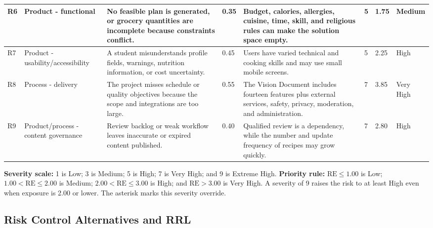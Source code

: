 \documentclass[11pt,a4paper]{article}
\begin{document}
\begin{landscape}
\begin{center}
\begin{longtable}{|p{0.8cm}|p{3.2cm}|p{5.1cm}|p{1.4cm}|p{8.0cm}|p{1.6cm}|p{1.3cm}|p{1.8cm}|}
R6 & Product - functional & No feasible plan is generated, or grocery quantities are incomplete because constraints conflict. & 0.35 & Budget, calories, allergies, cuisine, time, skill, and religious rules can make the solution space empty. & 5 & 1.75 & Medium \\ \hline
R7 & Product - usability/accessibility & A student misunderstands profile fields, warnings, nutrition information, or cost uncertainty. & 0.45 & Users have varied technical and cooking skills and may use small mobile screens. & 5 & 2.25 & High \\ \hline
R8 & Process - delivery & The project misses schedule or quality objectives because the scope and integrations are too large. & 0.55 & The Vision Document includes fourteen features plus external services, safety, privacy, moderation, and administration. & 7 & 3.85 & Very High \\ \hline
R9 & Product/process - content governance & Review backlog or weak workflow leaves inaccurate or expired content published. & 0.40 & Qualified review is a dependency, while the number and update frequency of recipes may grow quickly. & 7 & 2.80 & High \\ \hline
\end{longtable}
\end{center}
\end{landscape}

\textbf{Severity scale:} 1 is Low; 3 is Medium; 5 is High; 7 is Very High; and 9 is Extreme High. 
\textbf{Priority rule:} $\mathrm{RE}\leq 1.00$ is Low; $1.00<\mathrm{RE}\leq 2.00$ is Medium; $2.00<\mathrm{RE}\leq 3.00$ is High; and $\mathrm{RE}>3.00$ is Very High. A severity of 9 raises the risk to at least High even when exposure is 2.00 or lower. The asterisk marks this severity override.

\subsection{Risk Control Alternatives and RRL}
\end{document}
